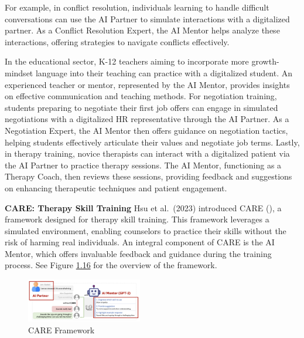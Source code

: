 \documentclass[
  letterpaper,
  DIV=11,
  numbers=noendperiod,
  oneside]{scrreprt}
\theoremstyle{remark}
\begin{document}
For example, in conflict resolution, individuals learning to handle
difficult conversations can use the AI Partner to simulate interactions
with a digitalized partner. As a Conflict Resolution Expert, the AI
Mentor helps analyze these interactions, offering strategies to navigate
conflicts effectively.

In the educational sector, K-12 teachers aiming to incorporate more
growth-mindset language into their teaching can practice with a
digitalized student. An experienced teacher or mentor, represented by
the AI Mentor, provides insights on effective communication and teaching
methods. For negotiation training, students preparing to negotiate their
first job offers can engage in simulated negotiations with a digitalized
HR representative through the AI Partner. As a Negotiation Expert, the
AI Mentor then offers guidance on negotiation tactics, helping students
effectively articulate their values and negotiate job terms. Lastly, in
therapy training, novice therapists can interact with a digitalized
patient via the AI Partner to practice therapy sessions. The AI Mentor,
functioning as a Therapy Coach, then reviews these sessions, providing
feedback and suggestions on enhancing therapeutic techniques and patient
engagement.

\textbf{CARE: Therapy Skill Training} Hsu et al.~(2023) introduced CARE
(), a framework designed
for therapy skill training. This framework leverages a simulated
environment, enabling counselors to practice their skills without the
risk of harming real individuals. An integral component of CARE is the
AI Mentor, which offers invaluable feedback and guidance during the
training process. See Figure \hyperref[fig:care]{1.16} for the overview
of the framework.

\begin{figure}

{\centering \includegraphics[width=0.45\textwidth,height=\textheight]{src/Figures/care.png}

}

\caption{CARE Framework}

\end{figure}%
\end{document}
